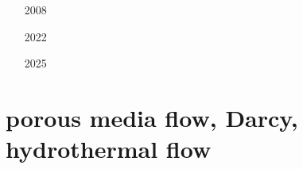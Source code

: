 \begin{small}
\begin{itemize}
\item[2008] 
\item[2022] 
\item[2025] 
\end{itemize}
\end{small}

\section{porous media flow, Darcy, hydrothermal flow} 

\begin{small}
\begin{itemize}
\item[\nineteeneightysix] 
\item[\nineteeneightyeight] 
\item[\nineteenninetyone]
\item[\nineteenninetythree] 
\item[\nineteenninetyeight] 
\item[\nineteenninetynine] 
 \\
\item[\twothousand] 
\item[\twothousandthirteen] 
\item[\twothousandfourteen] 
\item[\twothousandnineteen] 
\item[\twothousandtwenty] 
 \\
\item[\twothousandtwentytwo] 
\item[\twothousandtwentythree] 
\item[\twothousandtwentyfour] 
\end{itemize}
\end{small}


